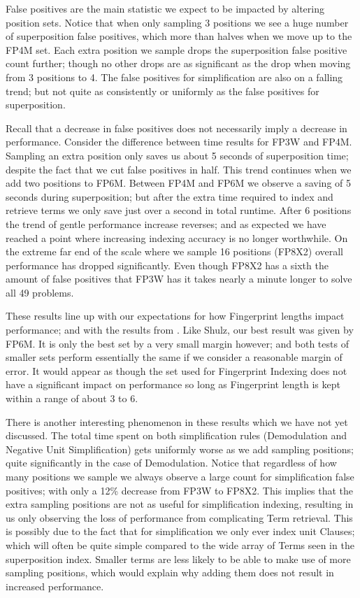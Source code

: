 
False positives are the main statistic we expect to be impacted by altering
position sets. Notice that when only sampling 3 positions we see a huge number
of superposition false positives, which more than halves when we move up to the FP4M set. Each
extra position we sample drops the superposition false positive count further;
though no other drops are as significant as the drop when moving from 3 positions to 4.
The false positives for simplification are also on a falling trend; but not quite as
consistently or uniformly as the false positives for superposition.

Recall that a decrease in false positives does not necessarily imply a decrease
in performance. Consider the difference between time results for FP3W and FP4M. Sampling
an extra position only saves us about 5 seconds of superposition time; despite the
fact that we cut false positives in half. This trend continues when we add two positions
to FP6M. Between FP4M and FP6M we observe a saving of 5 seconds during superposition;
but after the extra time required to index and retrieve terms we only save just over
a second in total runtime. After 6 positions the trend of gentle performance increase
reverses; and as expected we have reached a point where increasing indexing accuracy
is no longer worthwhile. On the extreme far end of the scale where we sample 16
positions (FP8X2) overall performance has dropped significantly. Even though FP8X2
has a sixth the amount of false positives that FP3W has it takes nearly a minute
longer to solve all 49 problems.

\pagebreak

These results line up with our expectations for how Fingerprint lengths impact
performance; and with the results from \cite{shulz12}. Like Shulz, our best result
was given by FP6M. It is only the best set by a very small margin however; and
both tests of smaller sets perform essentially the same if we consider a reasonable
margin of error. It would appear as though the set used for Fingerprint Indexing
does not have a significant impact on performance so long as Fingerprint length
is kept within a range of about 3 to 6.

There is another interesting phenomenon in these results which we have not yet discussed.
The total time spent on both simplification rules
(Demodulation and Negative Unit Simplification) gets uniformly worse as we add
sampling positions; quite significantly in the case of Demodulation. Notice that
regardless of how many positions we sample we always observe a large count for 
simplification false positives; with only a 12\% decrease from FP3W to FP8X2.
This implies that the extra sampling positions are not as useful for simplification
indexing, resulting in us only observing the loss of performance from complicating
Term retrieval. This is possibly due to the fact that for simplification we
only ever index unit Clauses; which will often be quite simple compared to the
wide array of Terms seen in the superposition index. Smaller terms are less likely
to be able to make use of more sampling positions, which would explain why adding
them does not result in increased performance.


